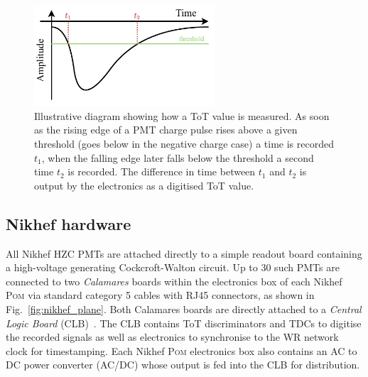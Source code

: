 \begin{figure} %
    \includegraphics[width=0.6\textwidth]{diagrams/5-daq/tot.pdf}
    \caption[Illustrative diagram showing how Time over Threshold is measured]
    {Illustrative diagram showing how a ToT value is measured. As soon as the rising edge of a PMT
        charge pulse rises above a given threshold (goes below in the negative charge case) a time
        is recorded $t_{1}$, when the falling edge later falls below the threshold a second time
        $t_{2}$ is recorded. The difference in time between $t_{1}$ and $t_{2}$ is output by the
        electronics as a digitised ToT value.}
    \label{fig:tot}
\end{figure}

\subsection{Nikhef hardware} %
\label{sec:daq_hard_Nikhed} %

All Nikhef HZC PMTs are attached directly to a simple readout board containing a high-voltage
generating Cockcroft-Walton circuit. Up to 30 such PMTs are connected to two \emph{Calamares}
boards within the electronics box of each Nikhef \textsc{Pom} via standard category 5 cables with
RJ45 connectors, as shown in Fig.~\ref{fig:nikhef_plane}. Both Calamares boards are directly
attached to a \emph{Central Logic Board} (CLB)~\cite{biagi2015, eijk2015}. The CLB contains ToT
discriminators and TDCs to digitise the recorded signals as well as electronics to synchronise to
the WR network clock for timestamping. Each Nikhef \textsc{Pom} electronics box also contains an
AC to DC power converter (AC/DC) whose output is fed into the CLB for distribution.

